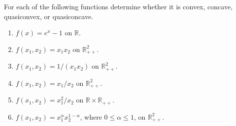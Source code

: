 \documentclass[11pt,letter,notitlepage]{article}
\theoremstyle{definition}
\begin{document}
\newpage	
\begin{exercise}[ ]
For each of the following functions determine whether it is convex, concave, quasiconvex, or quasiconcave.

\begin{enumerate}
    \item[(a)] \(f(x)=e^x-1\) on \(\mathbb{R}\).

    \item[(b)] \(f(x_1,x_2)=x_1x_2\) on \(\mathbb{R}_{++}^2\).

    \item[(c)] \(f(x_1,x_2)=1/(x_1x_2)\) on \(\mathbb{R}_{++}^2\).

    \item[(d)] \(f(x_1,x_2)=x_1/x_2\) on \(\mathbb{R}_{++}^2\).

    \item[(e)] \(f(x_1,x_2)=x_1^2/x_2\) on \(\mathbb{R}\times\mathbb{R}_{++}\).

    \item[(f)] \(f(x_1,x_2)=x_1^\alpha x_2^{1-\alpha}\), where \(0\le \alpha \le 1\), on \(\mathbb{R}_{++}^2\).
\end{enumerate}
\end{exercise}

\newpage
\end{document}
